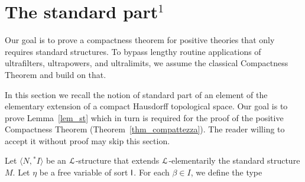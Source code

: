 \documentclass{amsproc}
\begin{document}
\begin{comment}
  for every $a\in({\rm dom }f)^{|x|}$ and every formula $\varphi(x)\in{\EuScript L}^{\rm p}$ without quantifiers of sort ${\sf H}$.
\end{fact}

\begin{proof}
  The equivalence is trivial for formulas in ${\EuScript L}_{\sf H}$ so we only consider atomic formulas of the form $t\in C$.
  Implication $\Rightarrow$ holds by definition. 
  Vice versa, if $M\models \tau(a)\notin C$ then, by normality,  $M\models \tau(a)\in\tilde{C}$ for some compact $\tilde C$ disjoint of $C$.
  By the definition of partial embedding, $N\models \tau(a)\in\tilde{C}$.
  Hence $N\models \tau(a)\notin C$.
  Induction is immediate.
\end{proof}
  
\end{comment}



\section[The standard part]{The standard part\boldmath$^1$}\label{standard_part}

Our goal is to prove a compactness theorem for positive theories that only requires standard structures.
To bypass lengthy routine applications of ultrafilters, ultrapowers, and ultralimits, %
we assume the classical Compactness Theorem and build on that.

In this section we recall the notion of standard part of an element of the elementary extension of a compact Hausdorff topological space.
Our goal is to prove Lemma~\ref{lem_st} which in turn is required for the proof of the positive Compactness Theorem (Theorem~\ref{thm_compattezza}).
The reader willing to accept it without proof may skip this section.

Let $\langle N, {}^*\!\!I\rangle$ be an ${\EuScript L}$-structure that extends ${\EuScript L}$-elementarily the standard structure $M$. %
Let $\eta$ be a free variable of sort ${\sf I}$.
For each $\beta\in I$, we define the type

\end{document}
